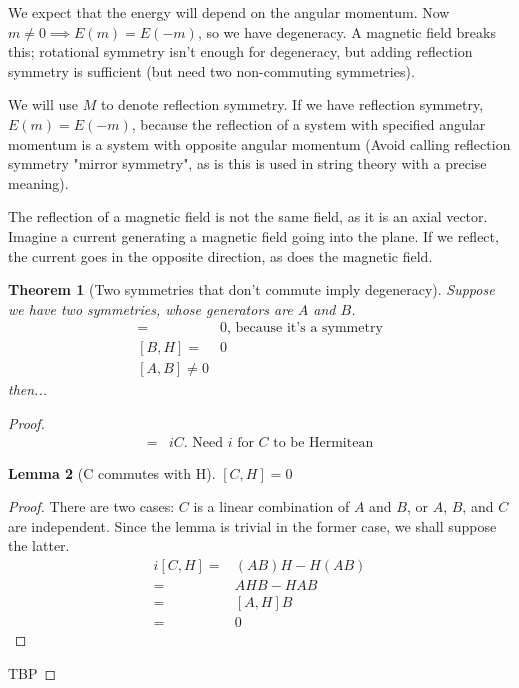 \documentclass[]{article}
\newtheorem{thm}{Theorem}
\newtheorem{lemma}[thm]{Lemma}
\begin{document}
We expect that the energy will depend on the angular momentum. Now $m\ne 0 \implies E(m)=E(-m)$, so we have degeneracy. A magnetic field breaks this; rotational symmetry isn't enough for degeneracy, but adding reflection symmetry is sufficient (but need two non-commuting symmetries).

We will use $M$ to denote reflection symmetry. If we have reflection symmetry, $E(m)=E(-m)$, because the reflection of a system with specified angular momentum is a system with opposite angular momentum (Avoid calling reflection symmetry "mirror symmetry", as is this is used in string theory with a precise meaning).

The reflection of a magnetic field is not the same field, as it is an axial vector. Imagine a current generating a magnetic field going into the plane. If we reflect, the current goes in the opposite direction, as does the magnetic field.

\begin{thm}[Two symmetries that don't commute imply degeneracy]
	Suppose we have two symmetries, whose generators are $A$ and $B$.
	\begin{align*}
		[A,H]=&0 \text{, because it's a symmetry}\\
		[B,H]=& 0\\
		[A,B]\ne 0
	\end{align*}
	then...
\end{thm}
\begin{proof}
	\begin{align*}
		[A,B]=& i C  \text{. Need $i$ for $C$ to be Hermitean}
	\end{align*}
	\begin{lemma}[C commutes with H]
		$[C,H]=0$
	\end{lemma}
	\begin{proof}
		There are two cases: $C$ is a linear combination of $A$ and $B$, or $A$, $B$, and $C$ are independent. Since the lemma is trivial in the former case, we shall suppose the latter.
		\begin{align*}
		i[C,H] =& (AB)H - H(AB)\\
		=& AHB -HAB\\
		=& [A,H]B\\
		=&0
		\end{align*}
	\end{proof}
	
	TBP
\end{proof}
\end{document}
